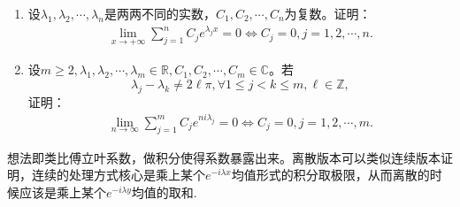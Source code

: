 \documentclass[../../main.tex]{subfiles}
\begin{document}
\begin{proposition}\label{proposition:三角求和极限结论1}
\begin{enumerate}
\item 设$\lambda_1,\lambda_2,\cdots,\lambda_n$是两两不同的实数，$C_1,C_2,\cdots,C_n$为复数。证明：
\begin{align*}
\lim_{x\to+\infty}\sum_{j=1}^n C_j e^{\lambda_j x}=0 \Leftrightarrow C_j=0,j=1,2,\cdots,n.
\end{align*}

\item 设$m\geqslant 2,\lambda_1,\lambda_2,\cdots,\lambda_m\in\mathbb{R},C_1,C_2,\cdots,C_m\in\mathbb{C}$。若
\[
\lambda_j-\lambda_k\neq2\ell\pi,\forall1\leqslant  j<k\leqslant  m,\ell\in\mathbb{Z},
\]
证明：
\begin{align*}
\lim_{n\to\infty}\sum_{j=1}^m C_j e^{ni\lambda_j}=0 \Leftrightarrow C_j=0,j=1,2,\cdots,m.
\end{align*}
\end{enumerate}
\end{proposition}
\begin{note}
想法即类比傅立叶系数，做积分使得系数暴露出来。离散版本可以类似连续版本证明，连续的处理方式核心是乘上某个$e^{-i\lambda x}$均值形式的积分取极限，从而离散的时候应该是乘上某个$e^{-i\lambda y}$均值的取和.
\end{note}
\end{document}
